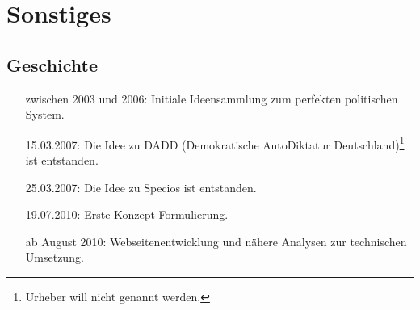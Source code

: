 \chapter{Sonstiges}\label{chap:misc}

\section{Geschichte}\label{sec:history}

\begin{itemize}[zwischen 2003 und 2006:]
\item[zwischen 2003 und 2006:] Initiale Ideensammlung zum perfekten politischen System.
\item[15.03.2007:] Die Idee zu DADD (Demokratische AutoDiktatur Deutschland)\footnote{Urheber will nicht genannt werden.} ist entstanden.
\item[25.03.2007:] Die Idee zu Specios ist entstanden.
\item[19.07.2010:] Erste Konzept-Formulierung.
\item[ab August 2010:] Webseitenentwicklung und nähere Analysen zur technischen Umsetzung.
\end{itemize}